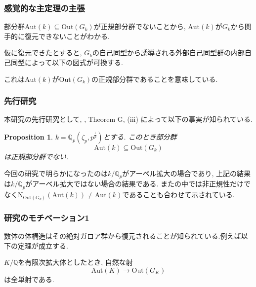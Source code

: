 \documentclass[dvipdfmx,19.8pt]{beamer}
\newcommand{\Blue}{\color{blue}}
\theoremstyle{theorem}
\newtheorem{prop}[theorem]{Proposition}
\theoremstyle{definition}
\def\bQ{{\mathbb Q}}
\def\Aut{{\mathrm{Aut}}}
\def\Out{{\mathrm{Out}}}
\begin{document}
\begin{frame}[fragile]

  \frametitle{感覚的な主定理の主張}
{\Blue 部分群$\mathrm{Aut}(k) \subseteq \mathrm{Out}(G_k)$が正規部分群でない}ことから, {\Blue $\mathrm{Aut}(k)$が$G_k$から関手的に復元できない}ことがわかる. 

\vspace{\baselineskip}



仮に復元できたとすると, $G_k$の自己同型から誘導される外部自己同型群の内部自己同型によって以下の図式が可換する. 


\vspace{\baselineskip}


\begin{center}
\end{center}
これは$\Aut(k)$が$\Out(G_k)$の正規部分群であることを意味している. 
\end{frame}


\begin{frame}[fragile]

  \frametitle{先行研究}

本研究の先行研究として, \cite{Hoshi2}, Theorem G, (iii) によって以下の事実が知られている. 
\begin{prop}
$k=\bQ_p(\zeta_p, p^{\frac{1}{p}})$とする. このとき部分群
\[
\Aut(k) \subseteq \Out(G_k)
\]
は正規部分群でない. 
\end{prop}

今回の研究で明らかになったのは$k/\bQ_p$がアーベル拡大の場合であり, 上記の結果は$k/\bQ_p$がアーベル拡大ではない場合の結果である. また\cite{Hoshi2}の中では非正規性だけでなく$\mathrm{N}_{\Out(G_k)}(\Aut(k)) \neq \Aut(k)$であることも合わせて示されている. 

\end{frame}



\begin{frame}[fragile]

  \frametitle{研究のモチベーション1}
数体の体構造はその絶対ガロア群から復元されることが知られている.例えば以下の定理が成立する.  
\begin{theorem}
$K/\bQ$を有限次拡大体としたとき, 自然な射
\[
\Aut(K) \rightarrow \Out(G_K)
\]
は全単射である. 
\end{theorem}
\end{frame}
\end{document}
